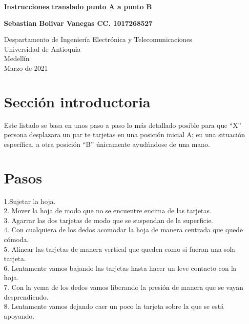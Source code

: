 \documentclass{article}
\begin{document}
\begin{titlepage}
    \begin{center}
        \vspace*{1cm}
            
        \Huge
        \textbf{Instrucciones translado punto A a punto B}
            
        \vspace{0.5cm}
        \LARGE
        
            
        \vspace{1.5cm}
            
        \textbf{Sebastian Bolivar Vanegas CC. 1017268527}
            
        \vfill
            
        \vspace{0.8cm}
            
        \Large
        Despartamento de Ingeniería Electrónica y Telecomunicaciones\\
        Universidad de Antioquia\\
        Medellín\\
        Marzo de 2021
            
    \end{center}
\end{titlepage}

\tableofcontents
\newpage
\section{Sección introductoria}\label{intro}
Este listado se basa en unos paso a paso lo más detallado posible para que “X” persona desplazara un par te tarjetas en una posición inicial A; en una situación específica, a otra posición “B” únicamente ayudándose de una mano.

\section{Pasos} \label{contenido}
1.Sujetar la hoja.\\
2. Mover la hoja de modo que no se encuentre encima de las tarjetas.\\ 
3. Agarrar las dos tarjetas de modo que se suspendan de la superficie. \\
4. Con cualquiera de los dedos acomodar la hoja de manera centrada que quede cómoda. \\
5. Alinear las tarjetas de manera vertical que queden como si fueran una sola tarjeta.  \\
6. Lentamente vamos bajando las tarjetas hasta hacer un leve contacto con la hoja. \\
7. Con la yema de los dedos vamos liberando la presión de manera que se vayan desprendiendo. \\
8. Lentamente vamos dejando caer un poco la tarjeta sobre la que se está apoyando. \\







\end{document}
